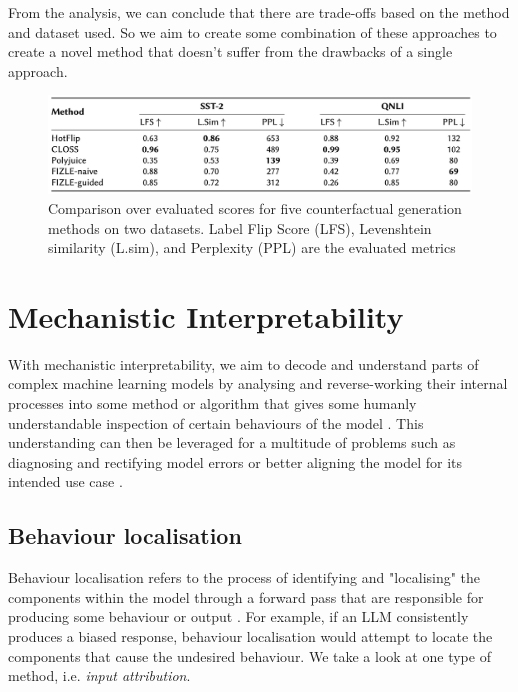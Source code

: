 From the analysis, we can conclude that there are trade-offs based on the method and dataset used. So we aim to create some combination of these approaches to create a novel method that doesn't suffer from the drawbacks of a single approach.

\begin{figure}[ht]
    \centering
    \includegraphics[width=1\linewidth]{ce_text_table.png}
    \caption{Comparison over evaluated scores for five counterfactual generation methods on two datasets. Label Flip Score (LFS), Levenshtein similarity (L.sim), and Perplexity (PPL) are the evaluated metrics \cite{mcaleese_comparative_2024}}
    \label{fig:ce_text_table}
\end{figure}

\newpage

\section{Mechanistic Interpretability}
With mechanistic interpretability, we aim to decode and understand parts of complex machine learning models by analysing and reverse-working their internal processes into some method or algorithm that gives some humanly understandable inspection of certain behaviours of the model \cite{geiger_causal_2021, wang_interpretability_2023}. This understanding can then be leveraged for a multitude of problems such as diagnosing and rectifying model errors \cite{vig_investigating_2020} or better aligning the model for its intended use case \cite{li_inference-time_2023}.

\subsection{Behaviour localisation}
Behaviour localisation refers to the process of identifying and "localising" the components within the model through a forward pass that are responsible for producing some behaviour or output \cite{ferrando_primer_2024}. For example, if an LLM consistently produces a biased response, behaviour localisation would attempt to locate the components that cause the undesired behaviour. We take a look at one type of method, i.e. \textit{input attribution}.

